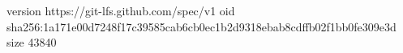 version https://git-lfs.github.com/spec/v1
oid sha256:1a171e00d7248f17c39585cab6cb0ec1b2d9318ebab8cdffb02f1bb0fe309e3d
size 43840
